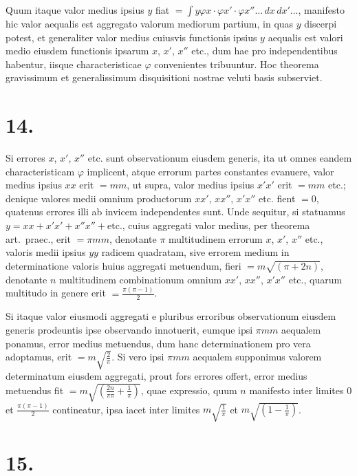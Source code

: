\documentclass[12pt,a4paper]{book}
\begin{document}
Quum itaque valor medius ipsius $y$ fiat $=\int y\varphi x\cdot\varphi x'\cdot\varphi x''\ldots\,dx\,dx'\ldots$, manifesto hic valor aequalis est aggregato valorum mediorum partium, in quas $y$ discerpi potest, et generaliter valor medius cuiusvis functionis ipsius $y$ aequalis est valori medio eiusdem functionis ipsarum $x$, $x'$, $x''$ etc., dum hae pro independentibus habentur, iisque characteristicae $\varphi$ convenientes tribuuntur. Hoc theorema gravissimum et generalissimum disquisitioni nostrae veluti basis subserviet.

\section*{14.}
\label{sec:art14}

Si errores $x$, $x'$, $x''$ etc. sunt observationum eiusdem generis, ita ut omnes eandem characteristicam $\varphi$ implicent, atque errorum partes constantes evanuere, valor medius ipsius $xx$ erit $=mm$, ut supra, valor medius ipsius $x'x'$ erit $=mm$ etc.; denique valores medii omnium productorum $xx'$, $xx''$, $x'x''$ etc. fient $=0$, quatenus errores illi ab invicem independentes sunt. Unde sequitur, si statuamus $y=xx+x'x'+x''x''+\text{etc.}$, cuius aggregati valor medius, per theorema art.~praec., erit $=\pi mm$, denotante $\pi$ multitudinem errorum $x$, $x'$, $x''$ etc., valoris medii ipsius $yy$ radicem quadratam, sive errorem medium in determinatione valoris huius aggregati metuendum, fieri $=m\sqrt{(\pi+2n)}$, denotante $n$ multitudinem combinationum omnium $xx'$, $xx''$, $x'x''$ etc., quarum multitudo in genere erit $=\tfrac{\pi(\pi-1)}{2}$.

Si itaque valor eiusmodi aggregati e pluribus erroribus obser\-vationum eiusdem generis prodeuntis ipse observando innotuerit, eumque ipsi $\pi mm$ aequalem ponamus, error medius metuendus, dum hanc determinationem pro vera adoptamus, erit $=m\sqrt{\tfrac{2}{\pi}}$. Si vero ipsi $\pi mm$ aequalem supponimus valorem determinatum eiusdem aggregati, prout fors errores offert, error medius metuendus fit $=m\sqrt{\left(\frac{2n}{\pi\pi}+\frac{1}{\pi}\right)}$, quae expressio, quum $n$ manifesto inter limites $0$ et $\tfrac{\pi(\pi-1)}{2}$ contineatur, ipsa iacet inter limites $m\sqrt{\tfrac{1}{\pi}}$ et $m\sqrt{\left(1-\tfrac{1}{\pi}\right)}$.

\section*{15.}
\label{sec:art15}
\end{document}
